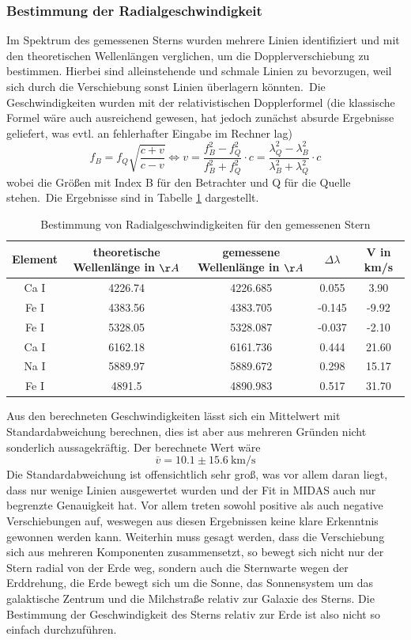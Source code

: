 \subsubsection{Bestimmung der Radialgeschwindigkeit}
Im Spektrum des gemessenen Sterns wurden mehrere Linien identifiziert und mit den theoretischen Wellenlängen verglichen, um die Dopplerverschiebung zu bestimmen. Hierbei sind alleinstehende und schmale Linien zu bevorzugen, weil sich durch die Verschiebung sonst Linien überlagern könnten.\
Die Geschwindigkeiten wurden mit der relativistischen Dopplerformel (die klassische Formel wäre auch ausreichend gewesen, hat jedoch zunächst absurde Ergebnisse geliefert, was evtl. an fehlerhafter Eingabe im Rechner lag)
\begin{equation}
f_B = f_Q \sqrt{\frac{c+v}{c-v}} \Leftrightarrow v = \frac{f_B^2 - f_Q^2}{f_B^2 + f_Q^2} \cdot c = \frac{\lambda_Q^2 - \lambda_B^2}{\lambda_B^2 + \lambda_Q^2}\cdot c
\end{equation}
wobei die Größen mit Index B für den Betrachter und Q für die Quelle stehen.\
Die Ergebnisse sind in Tabelle \ref{tab:Radial} dargestellt.

\begin{table}[htbp]
\begin{tabular}{c|c|c|c|c}
Element & theoretische Wellenlänge in $\AA$ & gemessene Wellenlänge in $\AA$ & $\Delta\lambda$ & V in km/s \\ \hline
Ca I & 4226.74 & 4226.685 & 0.055 & 3.90 \\ 
Fe I & 4383.56 & 4383.705 & -0.145 & -9.92 \\ 
Fe I & 5328.05 & 5328.087 & -0.037 & -2.10 \\ 
Ca I & 6162.18 & 6161.736 & 0.444 & 21.60 \\ 
Na I & 5889.97 & 5889.672 & 0.298 & 15.17 \\ 
Fe I & 4891.5 & 4890.983 & 0.517 & 31.70 \\ 
\end{tabular}
\caption{Bestimmung von Radialgeschwindigkeiten für den gemessenen Stern}
\label{tab:Radial}
\end{table}

Aus den berechneten Geschwindigkeiten lässt sich ein Mittelwert mit Standardabweichung berechnen, dies ist aber aus mehreren Gründen nicht sonderlich aussagekräftig. Der berechnete Wert wäre
\begin{equation}
\overline{v} = 10.1 \pm 15.6 \ \mathrm{km/s}
\end{equation}
Die Standardabweichung ist offensichtlich sehr groß, was vor allem daran liegt, dass nur wenige Linien ausgewertet wurden und der Fit in MIDAS auch nur begrenzte Genauigkeit hat. Vor allem treten sowohl positive als auch negative Verschiebungen auf, weswegen aus diesen Ergebnissen keine klare Erkenntnis gewonnen werden kann. 
Weiterhin muss gesagt werden, dass die Verschiebung sich aus mehreren Komponenten zusammensetzt, so bewegt sich nicht nur der Stern radial von der Erde weg, sondern auch die Sternwarte wegen der Erddrehung, die Erde bewegt sich um die Sonne, das Sonnensystem um das galaktische Zentrum und die Milchstraße relativ zur Galaxie des Sterns. Die Bestimmung der Geschwindigkeit des Sterns relativ zur Erde ist also nicht so einfach durchzuführen. 


